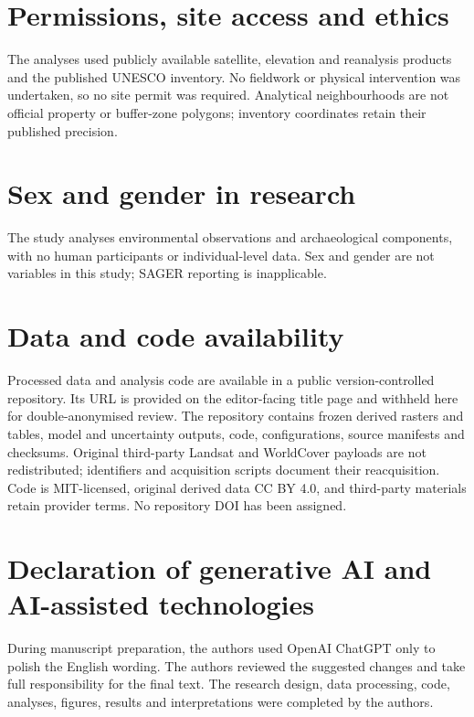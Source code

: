 
\section*{Permissions, site access and ethics}
The analyses used publicly available satellite, elevation and reanalysis products and the published UNESCO inventory. No fieldwork or physical intervention was undertaken, so no site permit was required. Analytical neighbourhoods are not official property or buffer-zone polygons; inventory coordinates retain their published precision.

\section*{Sex and gender in research}
The study analyses environmental observations and archaeological components, with no human participants or individual-level data. Sex and gender are not variables in this study; SAGER reporting is inapplicable.

\section*{Data and code availability}
Processed data and analysis code are available in a public version-controlled repository. Its URL is provided on the editor-facing title page and withheld here for double-anonymised review. The repository contains frozen derived rasters and tables, model and uncertainty outputs, code, configurations, source manifests and checksums. Original third-party Landsat and WorldCover payloads are not redistributed; identifiers and acquisition scripts document their reacquisition. Code is MIT-licensed, original derived data CC BY 4.0, and third-party materials retain provider terms. No repository DOI has been assigned.

\section*{Declaration of generative AI and AI-assisted technologies}
During manuscript preparation, the authors used OpenAI ChatGPT only to polish the English wording. The authors reviewed the suggested changes and take full responsibility for the final text. The research design, data processing, code, analyses, figures, results and interpretations were completed by the authors.

